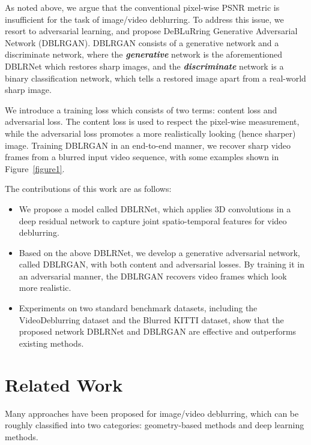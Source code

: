 \documentclass[journal]{IEEEtran}
\begin{document}
As noted above, we argue that the conventional pixel-wise PSNR metric is insufficient for the task of image/video deblurring. To address this issue, we resort to adversarial learning, and propose DeBLuRring Generative Adversarial Network (DBLRGAN). DBLRGAN consists of a generative network and a discriminate network, where the \textit{\textbf{generative}} network is the aforementioned DBLRNet which restores sharp images, and the \textit{\textbf{discriminate}} network is a binary classification network, which tells a restored image apart from a real-world sharp image.


We introduce a training loss which consists of two terms: content loss and adversarial loss. The content loss is used to respect the pixel-wise measurement, while the adversarial loss promotes a more realistically looking (hence sharper) image.  Training DBLRGAN in an end-to-end manner, we recover sharp video frames from a blurred input video sequence, with some examples shown in Figure~\ref{figure1}.

The contributions of this work are as follows:
\begin{itemize}
\item
We propose a model called DBLRNet, which applies  3D convolutions in a deep residual network to capture joint spatio-temporal features for video deblurring.
\item
Based on the above DBLRNet, we develop a generative adversarial network, called DBLRGAN, with both content and adversarial losses. By training it in an adversarial manner, the DBLRGAN recovers video frames which look more realistic.
\item Experiments on two standard benchmark datasets, including the VideoDeblurring dataset and the Blurred KITTI dataset, show that the proposed network DBLRNet and DBLRGAN are effective and outperforms existing methods.
\end{itemize}




\section{Related Work}

Many approaches have been proposed for image/video deblurring, which can be roughly classified into two categories: geometry-based methods and deep learning methods.
\end{document}
